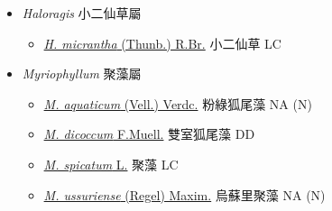 
  \begin{itemize}
 \item[] \textit{Haloragis} 小二仙草屬
                                
  \begin{itemize}
        \item[] \href{http://www.theplantlist.org/tpl1.1/search?q=Haloragis+micrantha}{\textit{H. micrantha} (Thunb.) R.Br.}   小二仙草   LC
  \end{itemize}
 \item[] \textit{Myriophyllum} 聚藻屬
                                
  \begin{itemize}
        \item[] \href{http://www.theplantlist.org/tpl1.1/search?q=Myriophyllum+aquaticum}{\textit{M. aquaticum} (Vell.) Verdc.}   粉綠狐尾藻   NA (N)
        \item[] \href{http://www.theplantlist.org/tpl1.1/search?q=Myriophyllum+dicoccum}{\textit{M. dicoccum} F.Muell.}   雙室狐尾藻   DD
        \item[] \href{http://www.theplantlist.org/tpl1.1/search?q=Myriophyllum+spicatum}{\textit{M. spicatum} L.}   聚藻   LC
        \item[] \href{http://www.theplantlist.org/tpl1.1/search?q=Myriophyllum+ussuriense}{\textit{M. ussuriense} (Regel) Maxim.}   烏蘇里聚藻   NA (N)
  \end{itemize}
  \end{itemize}
